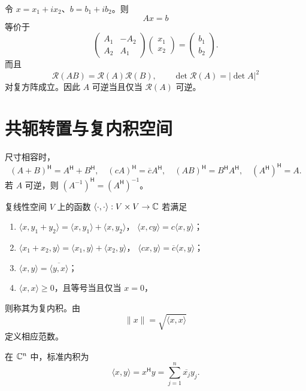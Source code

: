 \begin{proposition}[复线性方程组的实数化]
令 $x=x_1+ix_2$、$b=b_1+ib_2$。则
\[
Ax=b
\]
等价于
\[
\begin{pmatrix}A_1&-A_2\\A_2&A_1\end{pmatrix}
\begin{pmatrix}x_1\\x_2\end{pmatrix}
=\begin{pmatrix}b_1\\b_2\end{pmatrix}.
\]
而且
\[
\mathcal R(AB)=\mathcal R(A)\mathcal R(B),
\qquad
\det\mathcal R(A)=|\det A|^2
\]
对复方阵成立。因此 $A$ 可逆当且仅当 $\mathcal R(A)$ 可逆。
\end{proposition}

\section{共轭转置与复内积空间}

\begin{proposition}[共轭转置的运算律]
尺寸相容时，
\[
(A+B)^{\mathsf H}=A^{\mathsf H}+B^{\mathsf H},
\quad
(cA)^{\mathsf H}=\overline cA^{\mathsf H},
\quad
(AB)^{\mathsf H}=B^{\mathsf H}A^{\mathsf H},
\quad
(A^{\mathsf H})^{\mathsf H}=A.
\]
若 $A$ 可逆，则 $(A^{-1})^{\mathsf H}=(A^{\mathsf H})^{-1}$。
\end{proposition}

\begin{definition}[复内积]
复线性空间 $V$ 上的函数
$\langle\cdot,\cdot\rangle:V\times V\to\mathbb{C}$ 若满足
\begin{enumerate}
\item $\langle x,y_1+y_2\rangle=\langle x,y_1\rangle+\langle x,y_2\rangle$，
$\langle x,cy\rangle=c\langle x,y\rangle$；
\item $\langle x_1+x_2,y\rangle=\langle x_1,y\rangle+\langle x_2,y\rangle$，
$\langle cx,y\rangle=\overline c\langle x,y\rangle$；
\item $\langle x,y\rangle=\overline{\langle y,x\rangle}$；
\item $\langle x,x\rangle\ge0$，且等号当且仅当 $x=0$，
\end{enumerate}
则称其为复内积。由
\[
\lVert x\rVert=\sqrt{\langle x,x\rangle}
\]
定义相应范数。
\end{definition}

在 $\mathbb{C}^n$ 中，标准内积为
\[
\langle x,y\rangle=x^{\mathsf H}y
=\sum_{j=1}^n\overline{x_j}y_j.
\]

